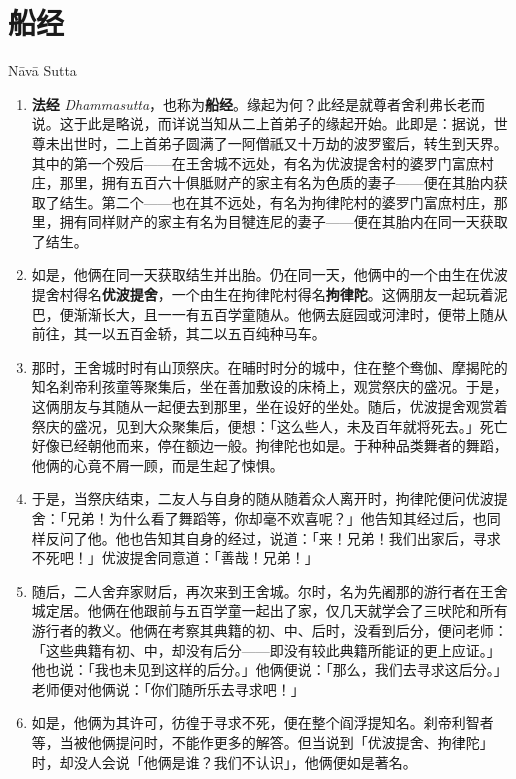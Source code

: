 \section{船经}

\begin{center}Nāvā Sutta\end{center}\vspace{1em}

\begin{enumerate}\item \textbf{法经} \textit{Dhammasutta}，也称为\textbf{船经}。缘起为何？此经是就尊者舍利弗长老而说。这于此是略说，而详说当知从二上首弟子的缘起开始。此即是：据说，世尊未出世时，二上首弟子圆满了一阿僧祇又十万劫的波罗蜜后，转生到天界。其中的第一个殁后——在王舍城不远处，有名为优波提舍村的婆罗门富庶村庄，那里，拥有五百六十俱胝财产的家主有名为色质的妻子——便在其胎内获取了结生。第二个——也在其不远处，有名为拘律陀村的婆罗门富庶村庄，那里，拥有同样财产的家主有名为目犍连尼的妻子——便在其胎内在同一天获取了结生。
\item 如是，他俩在同一天获取结生并出胎。仍在同一天，他俩中的一个由生在优波提舍村得名\textbf{优波提舍}，一个由生在拘律陀村得名\textbf{拘律陀}。这俩朋友一起玩着泥巴，便渐渐长大，且一一有五百学童随从。他俩去庭园或河津时，便带上随从前往，其一以五百金轿，其二以五百纯种马车。
\item 那时，王舍城时时有山顶祭庆。在晡时时分的城中，住在整个鸯伽、摩揭陀的知名刹帝利孩童等聚集后，坐在善加敷设的床椅上，观赏祭庆的盛况。于是，这俩朋友与其随从一起便去到那里，坐在设好的坐处。随后，优波提舍观赏着祭庆的盛况，见到大众聚集后，便想：「这么些人，未及百年就将死去。」死亡好像已经朝他而来，停在额边一般。拘律陀也如是。于种种品类舞者的舞蹈，他俩的心竟不屑一顾，而是生起了悚惧。
\item 于是，当祭庆结束，二友人与自身的随从随着众人离开时，拘律陀便问优波提舍：「兄弟！为什么看了舞蹈等，你却毫不欢喜呢？」他告知其经过后，也同样反问了他。他也告知其自身的经过，说道：「来！兄弟！我们出家后，寻求不死吧！」优波提舍同意道：「善哉！兄弟！」
\item 随后，二人舍弃家财后，再次来到王舍城。尔时，名为先阇那的游行者在王舍城定居。他俩在他跟前与五百学童一起出了家，仅几天就学会了三吠陀和所有游行者的教义。他俩在考察其典籍的初、中、后时，没看到后分，便问老师：「这些典籍有初、中，却没有后分——即没有较此典籍所能证的更上应证。」他也说：「我也未见到这样的后分。」他俩便说：「那么，我们去寻求这后分。」老师便对他俩说：「你们随所乐去寻求吧！」
\item 如是，他俩为其许可，彷徨于寻求不死，便在整个阎浮提知名。刹帝利智者等，当被他俩提问时，不能作更多的解答。但当说到「优波提舍、拘律陀」时，却没人会说「他俩是谁？我们不认识」，他俩便如是著名。

\end{enumerate}
